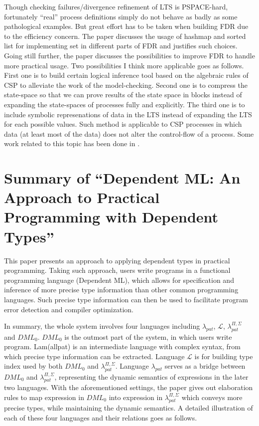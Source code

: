 \documentclass{llncs}
\newcommand{\dmllampat}{$\lambda_{pat}$}
\newcommand{\dmlL}{$\mathcal{L}$}
\newcommand{\dmllamall}{$\lambda_{pat}^{\Pi,\Sigma}$}
\newcommand{\dmlzero}{$DML_0$}
\begin{document}
Though checking failures/divergence refinement of LTS is PSPACE-hard,
fortunately ``real'' process definitions simply do not behave as badly as some
pathological examples. But great effort has to be taken when building FDR due 
to the efficiency concern. The paper discusses the usage of hashmap and sorted
list for implementing set in different parts of FDR and justifies such choices.
Going still further, the paper discusses the possibilities to improve
FDR to handle more practical usage. Two possibilities I think more applicable
goes as follows. First one is to build certain
logical inference tool based on the algebraic rules of CSP to alleviate the work
of the model-checking. Second one is to compress the state-space so
that we can prove results of the state space in blocks instead of expanding the
state-spaces of processes fully and explicitly. The third one is to include
symbolic represenations of data in the LTS instead of expanding the LTS for each
possible values. Such method is applicable to CSP processes in which data (at
least most of the data) does not alter the control-flow of a process. Some work 
related to this topic has been done in \cite{Lazic1999Semantic}.





\newpage 
\section{Summary of ``Dependent ML: An Approach to Practical
Programming with Dependent Types''\cite{Xi2007Dependent}}
  \label{section:DML}

This paper presents an approach to applying dependent types in practical
programming. Taking such approach, users write programs in a functional
programming language (Dependent ML), which allows for specification and
inference of more precise type information than other common programming
languages. Such precise type information can then be used to facilitate
program error detection and compiler optimization.

In summary, the whole system involves four languages including \dmllampat, \dmlL,
\dmllamall{} and \dmlzero. \dmlzero{} is the outmost part of the system, in which users
write program. Lam(allpat) is an intermediate language with complex syntax,
from which precise type information can be extracted. Language \dmlL{} is for
building type index used by both \dmlzero{} and \dmllamall. Language \dmllampat
serves as a bridge between \dmlzero{} and \dmllamall, representing the dynamic
semantics of expressions in the later two languages. With the aforementioned
settings, the paper gives out elaboration rules to map expression in \dmlzero
into expression in \dmllamall{} which conveys more precise types, while
maintaining the dynamic semantics. A detailed illustration of each of these
four languages and their relations goes as follows.
\end{document}
